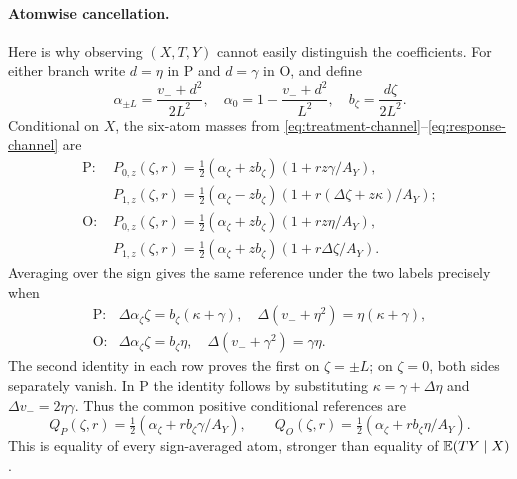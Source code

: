\documentclass{article}
\theoremstyle{definition}
\theoremstyle{remark}
\begin{document}
\paragraph{Atomwise cancellation.}
Here is why observing \((X,T,Y)\) cannot easily distinguish the coefficients. For either branch write \(d=\eta\) in P and \(d=\gamma\) in O, and define
\[
 \alpha_{\pm L}=\frac{v_-+d^2}{2L^2},\quad
 \alpha_0=1-\frac{v_-+d^2}{L^2},\quad b_\zeta=\frac{d\zeta}{2L^2}.
\]
Conditional on \(X\), the six-atom masses from \eqref{eq:treatment-channel}--\eqref{eq:response-channel} are
\begin{align*}
 \text{P: }& P_{0,z}(\zeta,r)=\tfrac12(\alpha_\zeta+zb_\zeta)(1+rz\gamma/A_Y),\\
 &P_{1,z}(\zeta,r)=\tfrac12(\alpha_\zeta-zb_\zeta)(1+r(\Delta \zeta+z\kappa)/A_Y);\\
 \text{O: }&P_{0,z}(\zeta,r)=\tfrac12(\alpha_\zeta+zb_\zeta)(1+rz\eta/A_Y),\\
 &P_{1,z}(\zeta,r)=\tfrac12(\alpha_\zeta+zb_\zeta)(1+r\Delta \zeta/A_Y).
\end{align*}
Averaging over the sign gives the same reference under the two labels precisely when
\[
 \begin{array}{ll}
 \text{P:}&\Delta\alpha_\zeta \zeta=b_\zeta(\kappa+\gamma),\quad
 \Delta(v_-+\eta^2)=\eta(\kappa+\gamma),\\
 \text{O:}&\Delta\alpha_\zeta \zeta=b_\zeta\eta,\quad
 \Delta(v_-+\gamma^2)=\gamma\eta.
 \end{array}
\]
The second identity in each row proves the first on \(\zeta=\pm L\); on \(\zeta=0\), both sides separately vanish. In P the identity follows by substituting \(\kappa=\gamma+\Delta\eta\) and \(\Delta v_-=2\eta\gamma\). Thus the common positive conditional references are
\[
 Q_P(\zeta,r)=\tfrac12(\alpha_\zeta+rb_\zeta\gamma/A_Y),\qquad
 Q_O(\zeta,r)=\tfrac12(\alpha_\zeta+rb_\zeta\eta/A_Y).
\]
This is equality of every sign-averaged atom, stronger than equality of \(\mathbb E(TY\mid X)\).
\end{document}
